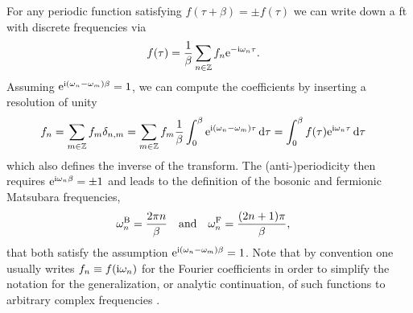 For any periodic function satisfying $f(\tau+\beta) = \pm f(\tau)$ we can write down a \gls{ft} with discrete frequencies via \cite[]{QMB_Nayak_2004}
\begin{align*}
f(\tau) &= \frac{1}{\beta} \sum_{n\in\mathbb{Z}} f_n \text{e}^{-\text{i} \omega_n \tau}.
\end{align*}
Assuming $\text{e}^{\text{i} (\omega_n - \omega_m)\beta} = 1$, we can compute the coefficients by inserting a resolution of unity
\begin{align*}
f_n &= \sum_{m\in\mathbb{Z}} f_m \delta_{n,m} = \sum_{m\in\mathbb{Z}} f_m \frac{1}{\beta} \int_{0}^{\beta} \text{e}^{\text{i} (\omega_n - \omega_m)\tau} \,\mathrm{d}\tau = \int_{0}^{\beta} f(\tau) \text{e}^{\text{i}\omega_n \tau} \,\mathrm{d}\tau
\end{align*}
which also defines the inverse of the transform.
The (anti-)periodicity then requires $\text{e}^{\text{i} \omega_n \beta} = \pm 1$ and leads to the definition of the bosonic and fermionic Matsubara frequencies,
\begin{align}
\omega_n^{\text{B}} &= \frac{2\pi n}{\beta} \quad\text{and}\quad \omega_n^{\text{F}} = \frac{(2n+1) \pi}{\beta}, \label{eqn:gf:Matsubara_freq_def}
\end{align}
that both satisfy the assumption $\text{e}^{\text{i} (\omega_n - \omega_m)\beta} = 1$.
Note that by convention one usually writes $f_n \equiv f(\text{i}\omega_n)$ for the Fourier coefficients in order to simplify the notation for the generalization, or analytic continuation, of such functions to arbitrary complex frequencies \cite{QMB_Bruus_2004}.
